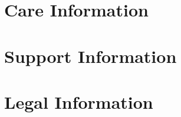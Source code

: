 \documentclass[12pt,letterpaper,onecolumn]{article}
\begin{document}
\section[Care]{Care Information}

\begin{comment}
Section: Support Information
Description: Technical support and other relevant information. This section might include frequently
	asked questions or common troubleshooting steps. Also, add any contact information (email,
	website, phone) for additional support information for your product.
\end{comment}
\section[Support]{Support Information}

\begin{comment}
Section: Legal Information
Description: Some types of products and equipment may have important legal considerations related
	to their use (example: for recording equipment, recording private conversations as a third-party
	is illegal in many states). Provide the user with any important legal information to help keep them,
	and your company, safe from lawsuits. Additionally, consider adding licensing information (even if
	you're using an open license) in this section. If your product is to have a warranty, this section is
	where you'll want to include that.
\end{comment}
\section[Legal]{Legal Information}
\end{document}
